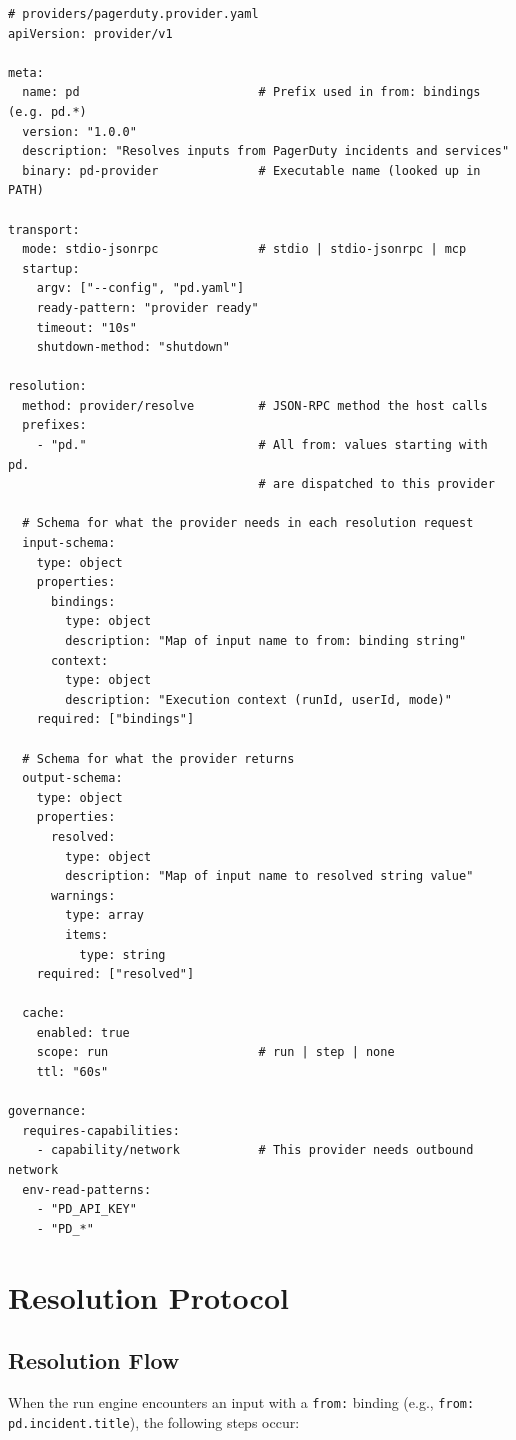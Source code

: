 \begin{verbatim}
# providers/pagerduty.provider.yaml
apiVersion: provider/v1

meta:
  name: pd                         # Prefix used in from: bindings (e.g. pd.*)
  version: "1.0.0"
  description: "Resolves inputs from PagerDuty incidents and services"
  binary: pd-provider              # Executable name (looked up in PATH)

transport:
  mode: stdio-jsonrpc              # stdio | stdio-jsonrpc | mcp
  startup:
    argv: ["--config", "pd.yaml"]
    ready-pattern: "provider ready"
    timeout: "10s"
    shutdown-method: "shutdown"

resolution:
  method: provider/resolve         # JSON-RPC method the host calls
  prefixes:
    - "pd."                        # All from: values starting with pd.
                                   # are dispatched to this provider

  # Schema for what the provider needs in each resolution request
  input-schema:
    type: object
    properties:
      bindings:
        type: object
        description: "Map of input name to from: binding string"
      context:
        type: object
        description: "Execution context (runId, userId, mode)"
    required: ["bindings"]

  # Schema for what the provider returns
  output-schema:
    type: object
    properties:
      resolved:
        type: object
        description: "Map of input name to resolved string value"
      warnings:
        type: array
        items:
          type: string
    required: ["resolved"]

  cache:
    enabled: true
    scope: run                     # run | step | none
    ttl: "60s"

governance:
  requires-capabilities:
    - capability/network           # This provider needs outbound network
  env-read-patterns:
    - "PD_API_KEY"
    - "PD_*"
\end{verbatim}

\section{Resolution Protocol}
\label{sec:provider-protocol}

\subsection{Resolution Flow}

When the run engine encounters an input with a \texttt{from:} binding (e.g.,
\texttt{from: pd.incident.title}), the following steps occur:


